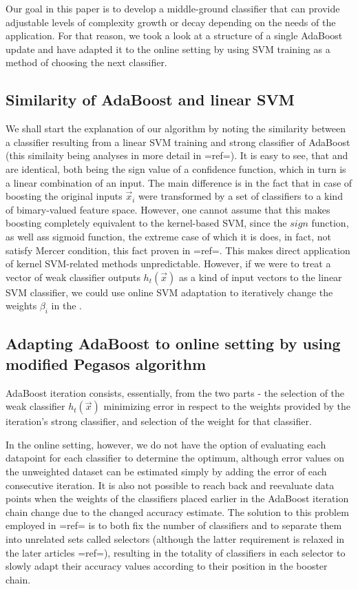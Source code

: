 Our goal in this paper is to develop a middle-ground classifier that can provide adjustable levels of complexity growth or decay depending on the needs of the application. For that reason, we took a look at a structure of a single AdaBoost update and have adapted it to the online setting by using SVM training as a method of choosing the next classifier.

\subsection{Similarity of AdaBoost and linear SVM}

We shall start the explanation of our algorithm by noting the similarity between a classifier resulting from a linear SVM training and strong classifier of AdaBoost (this similaity being analyses in more detail in {{=ref=}}). It is easy to see, that  and are identical, both being the sign value of a confidence function, which in turn is a linear combination of an input. The main difference is in the fact that in case of boosting the original inputs $\vec{x}_i$ were transformed by a set of classifiers to a kind of bimary-valued feature space. However, one cannot assume that this makes boosting completely equivalent to the kernel-based SVM, since the $sign$ function, as well ass sigmoid function, the extreme case of which it is does, in fact, not satisfy Mercer condition, this fact proven in {{=ref=}}. This makes direct application of kernel SVM-related methods unpredictable. However, if we were to treat a vector of weak classifier outputs $h_t(\vec{x})$ as a kind of input vectors to the linear SVM classifier, we could use online SVM adaptation to iteratively change the weights $\beta_i$ in the  .


\subsection{Adapting AdaBoost to online setting by using modified Pegasos algorithm}

AdaBoost iteration consists, essentially, from the two parts - the selection of the weak classifier $h_t(\vec{x})$ minimizing error in respect to the weights provided by the iteration's strong classifier, and selection of the weight for that classifier. 

In the online setting, however, we do not have the option of evaluating each datapoint for each classifier to determine the optimum, although error values on the unweighted dataset can be estimated simply by adding the error of each consecutive iteration. It is also not possible to reach back and reevaluate data points when the weights of the classifiers placed earlier in the AdaBoost iteration chain change due to the changed accuracy estimate. The solution to this problem employed in {{=ref=}} is to both fix the number of classifiers and to separate them into unrelated sets called selectors (although the latter requirement is relaxed in the later articles {{=ref=}}), resulting in the totality of classifiers in each selector to slowly adapt their accuracy values according to their position in the booster chain.

